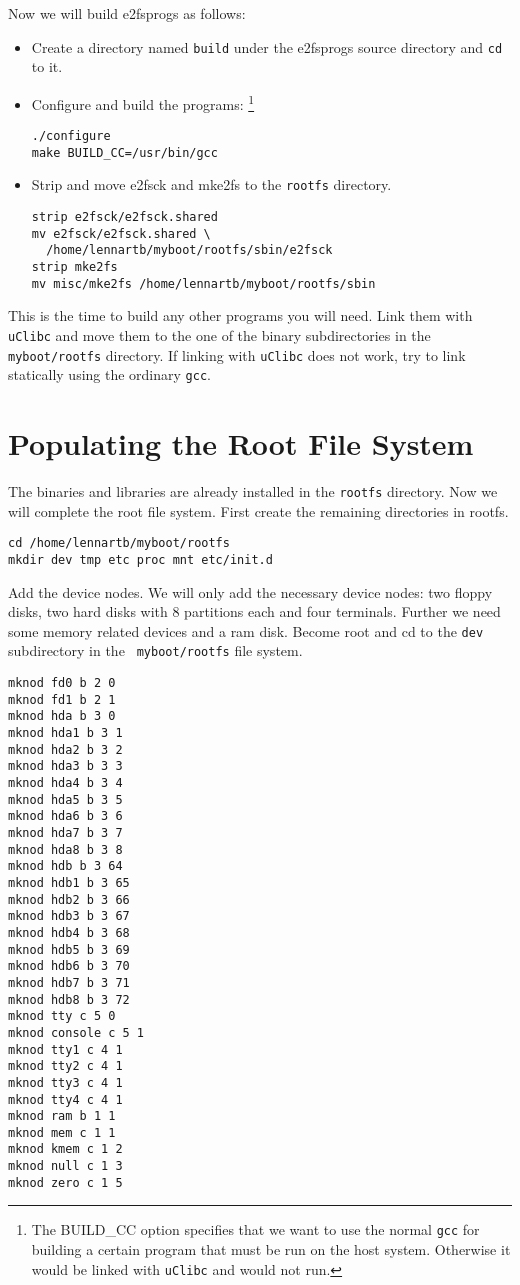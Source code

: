 \documentclass[12pt,a4paper]{article}
\begin{document}
Now we will build e2fsprogs as follows:
\begin{itemize}
\item Create a directory named {\tt build} under the e2fsprogs source
  directory and {\tt cd} to it.
\item Configure and build the programs:
\footnote{The BUILD\_CC option specifies that we want to use the normal
  {\tt gcc} for building a certain program that must be run on the
  host system. Otherwise it would be linked with {\tt uClibc} and
  would not run.} 
\begin{verbatim}
./configure
make BUILD_CC=/usr/bin/gcc
\end{verbatim}
\item Strip and move e2fsck and mke2fs to the {\tt rootfs} directory.
\begin{verbatim}
strip e2fsck/e2fsck.shared
mv e2fsck/e2fsck.shared \
  /home/lennartb/myboot/rootfs/sbin/e2fsck
strip mke2fs
mv misc/mke2fs /home/lennartb/myboot/rootfs/sbin
\end{verbatim}

\end{itemize}

This is the time to build any other programs you will need. Link them
with {\tt uClibc} and move them to the one of the binary
subdirectories in the {\tt myboot/rootfs} directory. If linking with
{\tt uClibc} does not work, try to link statically using the ordinary
{\tt gcc}.


\section{Populating the Root File System}


The binaries and libraries are already installed in the {\tt rootfs}
directory. Now we will complete the root file system.
First create the remaining directories in rootfs.
\begin{verbatim}
cd /home/lennartb/myboot/rootfs
mkdir dev tmp etc proc mnt etc/init.d
\end{verbatim}

Add the device nodes. We will only add the necessary device nodes: two
floppy disks, two hard disks with 8 partitions each and four
terminals. Further we need some memory related devices and a ram
disk. Become root and cd to the {\tt dev} subdirectory in the {\tt
myboot/rootfs} file system.
\begin{verbatim}
mknod fd0 b 2 0
mknod fd1 b 2 1
mknod hda b 3 0
mknod hda1 b 3 1
mknod hda2 b 3 2
mknod hda3 b 3 3
mknod hda4 b 3 4
mknod hda5 b 3 5
mknod hda6 b 3 6
mknod hda7 b 3 7
mknod hda8 b 3 8
mknod hdb b 3 64
mknod hdb1 b 3 65
mknod hdb2 b 3 66
mknod hdb3 b 3 67
mknod hdb4 b 3 68
mknod hdb5 b 3 69
mknod hdb6 b 3 70
mknod hdb7 b 3 71
mknod hdb8 b 3 72
mknod tty c 5 0
mknod console c 5 1
mknod tty1 c 4 1
mknod tty2 c 4 1
mknod tty3 c 4 1
mknod tty4 c 4 1
mknod ram b 1 1
mknod mem c 1 1
mknod kmem c 1 2
mknod null c 1 3
mknod zero c 1 5
\end{verbatim}
\end{document}
